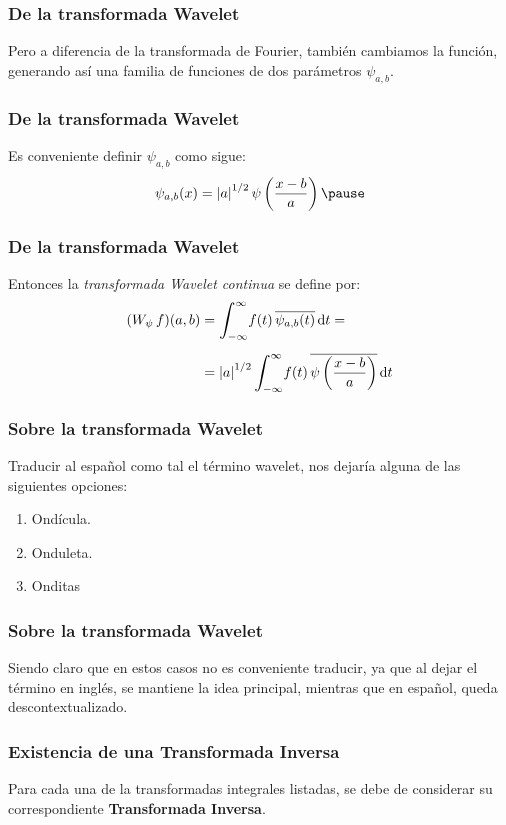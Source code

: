 \documentclass[12pt]{beamer}
\begin{document}
\begin{frame}
\frametitle{De la transformada Wavelet}
Pero a diferencia de la transformada de Fourier, también cambiamos la función, generando así una familia de funciones de dos parámetros $\psi_{a, b}$.
\end{frame}
\begin{frame}
\frametitle{De la transformada Wavelet}
Es conveniente definir $\psi_{a, b}$ como sigue:
\pause
\begin{align*}
\psi_{a, b} (x) = \abs{a}^{1/2} \, \psi \left( \dfrac{x - b}{a} \right)
\pause
\end{align*}
\end{frame}
\begin{frame}
\frametitle{De la transformada Wavelet}
Entonces la \emph{transformada Wavelet continua} se define por:
\pause
\begin{align*}
(W_{\psi} \, f) (a, b) &= \scaleint{6ex}_{\bs -\infty}^{\infty} f (t) \, \overline{\psi_{a, b} (t)} \dd{t} = \\[0.5em]
&= \abs{a}^{1/2} \, \scaleint{6ex}_{\bs -\infty}^{\infty} f (t) \, \overline{\psi \left( \dfrac{x - b}{a} \right)} \dd{t}
\end{align*}
\end{frame}
\begin{frame}
\frametitle{Sobre la transformada Wavelet}
Traducir al español como tal el término wavelet, nos dejaría alguna de las siguientes opciones:
\begin{enumerate}[<+->]
\item Ondícula.
\item Onduleta.
\item Onditas
\end{enumerate}
\end{frame}
\begin{frame}
\frametitle{Sobre la transformada Wavelet}
Siendo claro que en estos casos no es conveniente traducir, ya que al dejar el término en inglés, se mantiene la idea principal, mientras que en español, queda descontextualizado.
\end{frame}
\begin{frame}
\frametitle{Existencia de una Transformada Inversa}
Para cada una de la transformadas integrales listadas, se debe de considerar su correspondiente \textbf{\textcolor{carnelian}{Transformada Inversa}}.
\end{frame}
\end{document}
